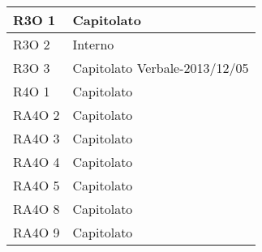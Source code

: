 \begin{center}
\begin{longtable}{ | p{5cm} | p{5cm} |}
        R3O 1 &  Capitolato \newline  \\ \hline      
        R3O 2 &  Interno \newline  \\ \hline      
        R3O 3 &  Capitolato \newline  Verbale-2013/12/05 \newline  \\ \hline      
        R4O 1 &  Capitolato \newline  \\ \hline      
        RA4O 2 &  Capitolato \newline  \\ \hline      
        RA4O 3 &  Capitolato \newline  \\ \hline      
        RA4O 4 &  Capitolato \newline  \\ \hline      
        RA4O 5 &  Capitolato \newline  \\ \hline      
        RA4O 8 &  Capitolato \newline  \\ \hline      
        RA4O 9 &  Capitolato \newline  \\ \hline     
      \end{longtable}
      \egroup
      \end{center}  
\clearpage


